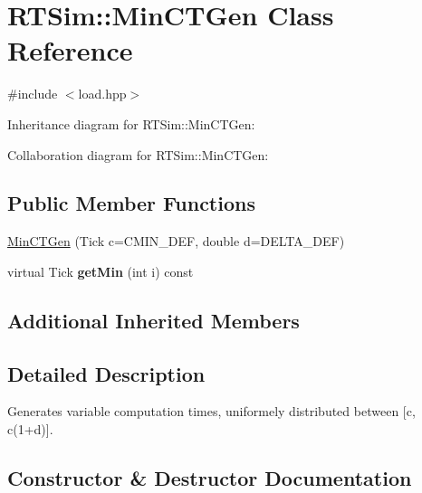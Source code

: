 \hypertarget{classRTSim_1_1MinCTGen}{}\section{R\+T\+Sim\+:\+:Min\+C\+T\+Gen Class Reference}
\label{classRTSim_1_1MinCTGen}


{\ttfamily \#include $<$load.\+hpp$>$}



Inheritance diagram for R\+T\+Sim\+:\+:Min\+C\+T\+Gen\+:


Collaboration diagram for R\+T\+Sim\+:\+:Min\+C\+T\+Gen\+:
\subsection*{Public Member Functions}
\begin{DoxyCompactItemize}
\item 
\hyperlink{classRTSim_1_1MinCTGen_ab3b8babc25167c9cfe38b37910c52732}{Min\+C\+T\+Gen} (Tick c=C\+M\+I\+N\+\_\+\+D\+EF, double d=D\+E\+L\+T\+A\+\_\+\+D\+EF)
\item 
virtual Tick {\bfseries get\+Min} (int i) const \hypertarget{classRTSim_1_1MinCTGen_ad77c40aa00074a858efadc818231a6f5}{}\label{classRTSim_1_1MinCTGen_ad77c40aa00074a858efadc818231a6f5}

\end{DoxyCompactItemize}
\subsection*{Additional Inherited Members}


\subsection{Detailed Description}
Generates variable computation times, uniformely distributed between \mbox{[}c, c(1+d)\mbox{]}. 

\subsection{Constructor \& Destructor Documentation}
